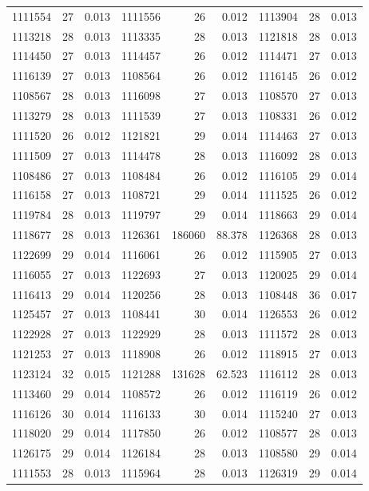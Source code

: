 \documentclass[11pt,a4paper]{article}
\begin{document}
\begin{longtable}{rrr|rrr|rrr}
1111554 & 27 & 0.013 & 1111556 & 26 & 0.012 & 1113904 & 28 & 0.013\\
1113218 & 28 & 0.013 & 1113335 & 28 & 0.013 & 1121818 & 28 & 0.013\\
1114450 & 27 & 0.013 & 1114457 & 26 & 0.012 & 1114471 & 27 & 0.013\\
1116139 & 27 & 0.013 & 1108564 & 26 & 0.012 & 1116145 & 26 & 0.012\\
1108567 & 28 & 0.013 & 1116098 & 27 & 0.013 & 1108570 & 27 & 0.013\\
1113279 & 28 & 0.013 & 1111539 & 27 & 0.013 & 1108331 & 26 & 0.012\\
1111520 & 26 & 0.012 & 1121821 & 29 & 0.014 & 1114463 & 27 & 0.013\\
1111509 & 27 & 0.013 & 1114478 & 28 & 0.013 & 1116092 & 28 & 0.013\\
1108486 & 27 & 0.013 & 1108484 & 26 & 0.012 & 1116105 & 29 & 0.014\\
1116158 & 27 & 0.013 & 1108721 & 29 & 0.014 & 1111525 & 26 & 0.012\\
1119784 & 28 & 0.013 & 1119797 & 29 & 0.014 & 1118663 & 29 & 0.014\\
1118677 & 28 & 0.013 & 1126361 & 186060 & 88.378 & 1126368 & 28 & 0.013\\
1122699 & 29 & 0.014 & 1116061 & 26 & 0.012 & 1115905 & 27 & 0.013\\
1116055 & 27 & 0.013 & 1122693 & 27 & 0.013 & 1120025 & 29 & 0.014\\
1116413 & 29 & 0.014 & 1120256 & 28 & 0.013 & 1108448 & 36 & 0.017\\
1125457 & 27 & 0.013 & 1108441 & 30 & 0.014 & 1126553 & 26 & 0.012\\
1122928 & 27 & 0.013 & 1122929 & 28 & 0.013 & 1111572 & 28 & 0.013\\
1121253 & 27 & 0.013 & 1118908 & 26 & 0.012 & 1118915 & 27 & 0.013\\
1123124 & 32 & 0.015 & 1121288 & 131628 & 62.523 & 1116112 & 28 & 0.013\\
1113460 & 29 & 0.014 & 1108572 & 26 & 0.012 & 1116119 & 26 & 0.012\\
1116126 & 30 & 0.014 & 1116133 & 30 & 0.014 & 1115240 & 27 & 0.013\\
1118020 & 29 & 0.014 & 1117850 & 26 & 0.012 & 1108577 & 28 & 0.013\\
1126175 & 29 & 0.014 & 1126184 & 28 & 0.013 & 1108580 & 29 & 0.014\\
1111553 & 28 & 0.013 & 1115964 & 28 & 0.013 & 1126319 & 29 & 0.014\\

\end{longtable}
\end{document}
